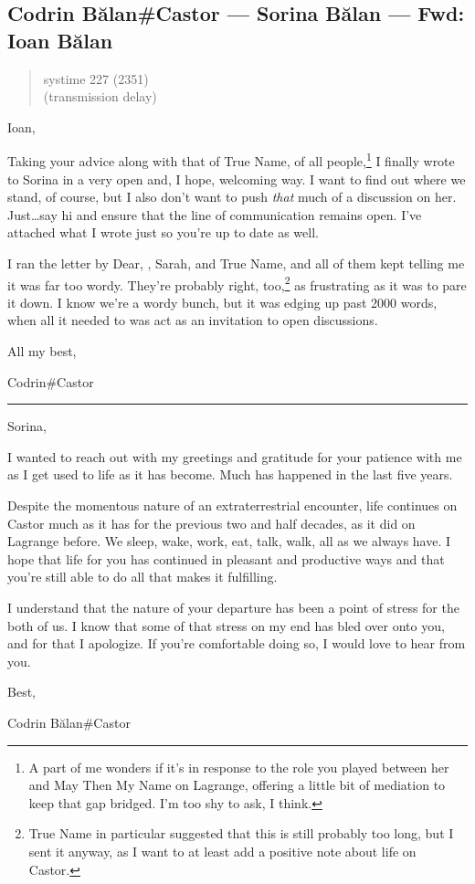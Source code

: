 \hypertarget{codrin-bux103lancastor-sorina-bux103lan-fwd-ioan-bux103lan}{%
\subsection{Codrin Bălan\#Castor — Sorina Bălan — Fwd: Ioan Bălan}\label{codrin-bux103lancastor-sorina-bux103lan-fwd-ioan-bux103lan}}

\begin{quote}
systime 227 (2351)\\
(transmission delay)
\end{quote}

Ioan,

Taking your advice along with that of True Name, of all people,\footnote{A part of me wonders if it's in response to the role you played between her and May Then My Name on Lagrange, offering a little bit of mediation to keep that gap bridged. I'm too shy to ask, I think.} I finally wrote to Sorina in a very open and, I hope, welcoming way. I want to find out where we stand, of course, but I also don't want to push \emph{that} much of a discussion on her. Just\ldots{}say hi and ensure that the line of communication remains open. I've attached what I wrote just so you're up to date as well.

I ran the letter by Dear, \Partner , Sarah, and True Name, and all of them kept telling me it was far too wordy. They're probably right, too,\footnote{True Name in particular suggested that this is still probably too long, but I sent it anyway, as I want to at least add a positive note about life on Castor.} as frustrating as it was to pare it down. I know we're a wordy bunch, but it was edging up past 2000 words, when all it needed to was act as an invitation to open discussions.

All my best,

Codrin\#Castor

\begin{center}\rule{0.5\linewidth}{0.5pt}\end{center}

Sorina,

I wanted to reach out with my greetings and gratitude for your patience with me as I get used to life as it has become. Much has happened in the last five years.

Despite the momentous nature of an extraterrestrial encounter, life continues on Castor much as it has for the previous two and half decades, as it did on Lagrange before. We sleep, wake, work, eat, talk, walk, all as we always have. I hope that life for you has continued in pleasant and productive ways and that you're still able to do all that makes it fulfilling.

I understand that the nature of your departure has been a point of stress for the both of us. I know that some of that stress on my end has bled over onto you, and for that I apologize. If you're comfortable doing so, I would love to hear from you.

Best,

Codrin Bălan\#Castor
